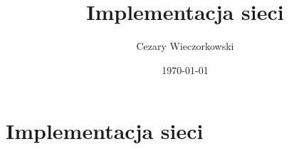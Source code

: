\documentclass[../main.tex]{subfiles}
\author{Cezary Wieczorkowski}
\date{\today}
\title{Implementacja sieci}
\begin{document}
\section{Implementacja sieci}
\end{document}
